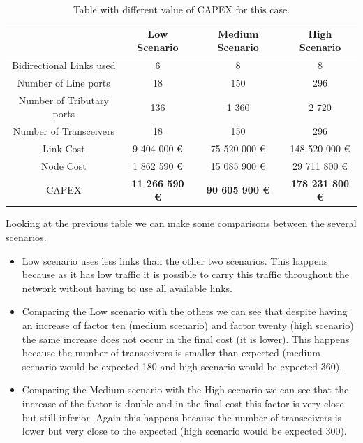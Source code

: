 \begin{table}[h!]
\centering
\begin{tabular}{| c | c | c | c |}
 \hline
   & Low Scenario & Medium Scenario  & High Scenario \\
 \hline\hline
 Bidirectional Links used & 6 & 8 & 8 \\ \hline
 Number of Line ports & 18 & 150 & 296 \\ \hline
 Number of Tributary ports & 136 & 1 360 & 2 720 \\ \hline
 Number of Transceivers & 18 & 150 & 296 \\ \hline
 Link Cost & 9 404 000 \euro & 75 520 000 \euro & 148 520 000 \euro \\ \hline
 Node Cost & 1 862 590 \euro & 15 085 900 \euro & 29 711 800 \euro \\ \hline
 CAPEX & \textbf{11 266 590 \euro} & \textbf{90 605 900 \euro} & \textbf{178 231 800 \euro} \\
 \hline
\end{tabular}
\caption{Table with different value of CAPEX for this case.}
\label{table_comparative_opaque_surv}
\end{table}

\newpage
Looking at the previous table we can make some comparisons between the several scenarios.

\begin{itemize}
  \item Low scenario uses less links than the other two scenarios.
  \subitem This happens because as it has low traffic it is possible to carry this traffic throughout the network without having to use all available links.
  \item Comparing the Low scenario with the others we can see that despite having an increase of factor ten (medium scenario) and factor twenty (high scenario) the same increase does not occur in the final cost (it is lower).
  \subitem This happens because the number of transceivers is smaller than expected (medium scenario would be expected 180 and high scenario would be expected 360).
  \item Comparing the Medium scenario with the High scenario we can see that the increase of the factor is double and in the final cost this factor is very close but still inferior.
  \subitem Again this happens because the number of transceivers is lower but very close to the expected (high scenario would be expected 300).
\end{itemize}

